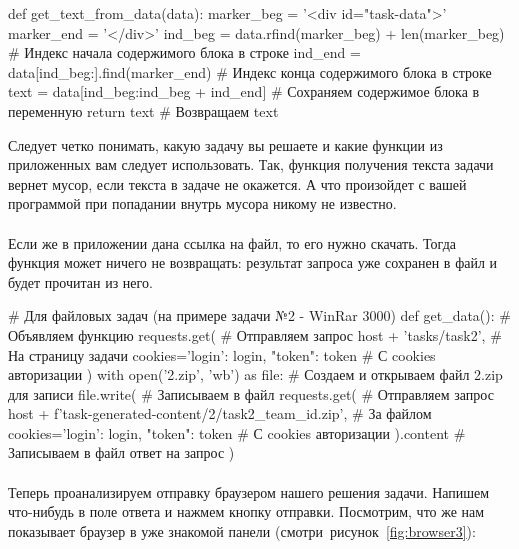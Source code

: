 \documentclass[12pt]{article}
\begin{document}
    \begin{pythoncode}
def get_text_from_data(data):
    marker_beg = '<div id="task-data">'
    marker_end = '</div>'
    ind_beg = data.rfind(marker_beg) + len(marker_beg)  # Индекс начала содержимого блока в строке
    ind_end = data[ind_beg:].find(marker_end)           # Индекс конца содержимого блока в строке
    text = data[ind_beg:ind_beg + ind_end]              # Сохраняем содержимое блока в переменную
    return text # Возвращаем text
    \end{pythoncode}

    Следует четко понимать, какую задачу вы решаете и какие функции из приложенных вам следует использовать.
    Так, функция получения текста задачи вернет мусор, если текста в задаче не окажется.
    А что произойдет с вашей программой при попадании внутрь мусора никому не известно.
    \paragraph{}
    Если же в приложении дана ссылка на файл, то его нужно скачать.
    Тогда функция может ничего не возвращать: результат запроса уже сохранен в файл и будет прочитан из него.

    \begin{pythoncode}
# Для файловых задач (на примере задачи №2 - WinRar 3000)
def get_data(): # Объявляем функцию
    requests.get(                                 # Отправляем запрос
        host + 'tasks/task2',                     # На страницу задачи
        cookies={'login': login, "token": token}  # С cookies авторизации
    )
    with open('2.zip', 'wb') as file: # Создаем и открываем файл 2.zip для записи
        file.write(                               # Записываем в файл
            requests.get(                         # Отправляем запрос
                host + f'task-generated-content/2/task2_{team_id}.zip', # За файлом
                cookies={'login': login, "token": token} # С cookies авторизации
            ).content # Записываем в файл ответ на запрос
        )
    \end{pythoncode}

    \paragraph{}
    Теперь проанализируем отправку браузером нашего решения задачи.
    Напишем что-нибудь в поле ответа и нажмем кнопку отправки.
    Посмотрим, что же нам показывает браузер в уже знакомой панели (смотри~рисунок~\ref{fig:browser3}):
\end{document}
